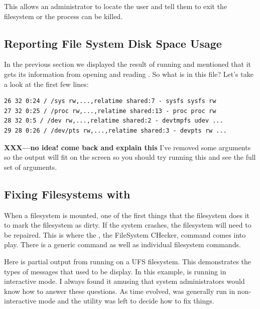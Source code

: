 \noindent
This allows an administrator to locate the user and tell them to exit the filesystem or the process can be killed.



\subsection{Reporting File System Disk Space Usage}

In the previous section we displayed the result of running  and mentioned that it gets its information from opening and reading . So what is in this file? Let's take a look at the first few lines:

\begin{lstlisting}
26 32 0:24 / /sys rw,...,relatime shared:7 - sysfs sysfs rw
27 32 0:25 / /proc rw,...,relatime shared:13 - proc proc rw
28 32 0:5 / /dev rw,...,relatime shared:2 - devtmpfs udev ...
29 28 0:26 / /dev/pts rw,...,relatime shared:3 - devpts rw ...
\end{lstlisting}

\noindent
{\bfseries XXX---no idea! come back and explain this}
I've removed some arguments so the output will fit on the screen so you should try running this and see the full set of arguments.

\subsection{Fixing Filesystems with }

When a filesystem is mounted, one of the first things that the filesystem does it to mark the filesystem as dirty. If the system crashes, the filesystem will need to be repaired. This is where the , the FileSystem CHecker, command comes into play. There is a generic  command as well as individual filesystem  commands.

Here is partial output from running  on a UFS filesystem. This demonstrates the types of messages that used to be display. In this example,  is running in interactive mode. I always found it amusing that system administrators would know how to answer these questions. As time evolved,  was generally run in non-interactive mode and the utility was left to decide how to fix things.

